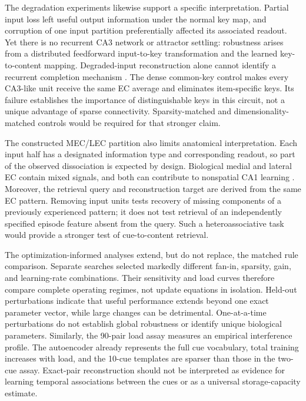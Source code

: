 The degradation experiments likewise support a specific interpretation.
Partial input loss left useful output information under the normal key map,
and corruption of one input partition preferentially affected its associated
readout. Yet there is no recurrent CA3 network or attractor settling:
robustness arises from a distributed feedforward input-to-key transformation
and the learned key-to-content mapping. Degraded-input reconstruction alone
cannot identify a recurrent completion mechanism
\citep{nakazawa2002,li2024}. The dense common-key control makes every CA3-like
unit receive the same EC average and eliminates item-specific keys. Its
failure establishes the importance of distinguishable keys in this circuit,
not a unique advantage of sparse connectivity. Sparsity-matched and
dimensionality-matched controls would be required for that stronger claim.

The constructed MEC/LEC partition also limits anatomical interpretation.
Each input half has a designated information type and corresponding readout,
so part of the observed dissociation is expected by design. Biological medial
and lateral EC contain mixed signals, and both can contribute to nonspatial
CA1 learning \citep{henriksen2010,deshmukh2011,dorian2026a}. Moreover, the
retrieval query and reconstruction target are derived from the same EC
pattern. Removing input units tests recovery of missing components of a
previously experienced pattern; it does not test retrieval of an independently
specified episode feature absent from the query. Such a heteroassociative
task would provide a stronger test of cue-to-content retrieval.

The optimization-informed analyses extend, but do not replace, the matched
rule comparison. Separate searches selected markedly different fan-in,
sparsity, gain, and learning-rate combinations. Their sensitivity and load
curves therefore compare complete operating regimes, not update equations
in isolation. Held-out perturbations indicate that useful performance extends
beyond one exact parameter vector, while large changes can be detrimental.
One-at-a-time perturbations do not establish global robustness or identify
unique biological parameters. Similarly, the 90-pair load assay measures an
empirical interference profile. The autoencoder already represents the full
cue vocabulary, total training increases with load, and the 10-cue templates
are sparser than those in the two-cue assay. Exact-pair reconstruction should
not be interpreted as evidence for learning temporal associations between
the cues or as a universal storage-capacity estimate.


